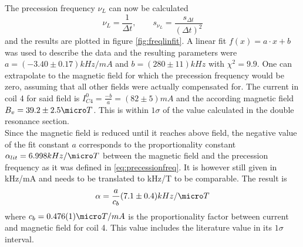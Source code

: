 The precession frequency $\nu_L$ can now be calculated
\begin{equation}
\nu_L=\frac{1}{\Delta t},\qquad s_{\nu_L}=\frac{s_{\Delta t}}{(\Delta t)^2}
\end{equation}
and the results are plotted in figure \ref{fig:freqlinfit}. A linear fit $f(x)=a\cdot x+b$ was used to describe the data and the resulting parameters were $a=\unit{(-3.40\pm0.17)}{kHz/mA}$ and $b=\unit{(280\pm11)}{kHz}$ with $\chi^2=9.9$. One can extrapolate to the magnetic field for which the precession frequency would be zero, assuming that all other fields were actually compensated for. The current in coil 4 for said field is $I^0_{C4}=\frac{-b}{a}=\unit{(82\pm5)}{mA}$ and the according magnetic field $B_v=\unit{39.2\pm2.5}{\micro T}$. This is within $1\sigma$ of the value calculated in the double resonance section.\\
Since the magnetic field is reduced until it reaches above field, the negative value of the fit constant $a$ corresponds to the proportionality constant $\alpha_{lit}=\unit{6.998}{kHz/\micro T}$ between the magnetic field and the precession frequency as it was defined in \ref{eq:precessionfreq}. It is however still given in kHz/mA and needs to be translated to kHz/\micro T to be comparable. The result is
\begin{equation}
\alpha=\frac{a}{c_b}\unit{(7.1\pm0.4)}{kHz/\micro T}
\end{equation}
where $c_b=\unit{0.476(1)}{\micro T/mA}$ is the proportionality factor between current and magnetic field for coil 4. This value includes the literature value in its $1\sigma$ interval.
